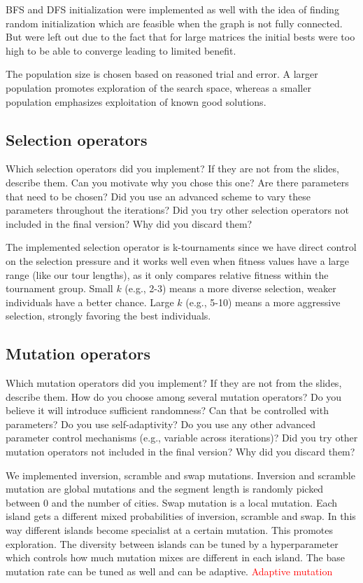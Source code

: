 \documentclass[a4paper,10pt]{article}
\newcommand{\ReplaceMe}[1]{{\color{blue}#1}}
\begin{document}
\noindent
BFS and DFS initialization were implemented as well with the idea of finding random initialization which are feasible when the graph is not fully connected. 
But were left out due to the fact that for large matrices the initial bests were too high to be able to converge leading to limited benefit.

\noindent
The population size is chosen based on reasoned trial and error. A larger population promotes exploration of the search space, whereas a smaller population emphasizes exploitation of known good solutions.
\subsection{Selection operators}
\ReplaceMe{Which selection operators did you implement? If they are not from the slides, describe them. Can you motivate why you chose this one? Are there parameters that need to be chosen? Did you use an advanced scheme to vary these parameters throughout the iterations? Did you try other selection operators not included in the final version? Why did you discard them?}

\noindent
The implemented selection operator is k-tournaments since we have direct control on the selection pressure and it works well even when
fitness values have a large range (like our tour lengths), as it only compares relative fitness within the tournament
group. Small $k$ (e.g., 2-3) means a more diverse selection, weaker individuals have a better chance. Large $k$ (e.g.,
5-10) means a more aggressive selection, strongly favoring the best individuals.


\subsection{Mutation operators}

\ReplaceMe{Which mutation operators did you implement? If they are not from the slides, describe them. How do you choose among several mutation operators? Do you believe it will introduce sufficient randomness? Can that be controlled with parameters? Do you use self-adaptivity? Do you use any other advanced parameter control mechanisms (e.g., variable across iterations)? Did you try other mutation operators not included in the final version? Why did you discard them?}

\noindent
We implemented inversion, scramble and swap mutations. 
Inversion and scramble mutation are global mutations and the segment length is randomly picked between 0 and the number of cities.
Swap mutation is a local mutation.
Each island gets a different mixed probabilities of inversion, scramble and swap. 
In this way different islands become specialist at a certain mutation. This promotes exploration. 
The diversity between islands can be tuned by a hyperparameter which controls how much mutation mixes are different in each island.
The base mutation rate can be tuned as well and can be adaptive.
\textcolor{red}{Adaptive mutation}
\end{document}
